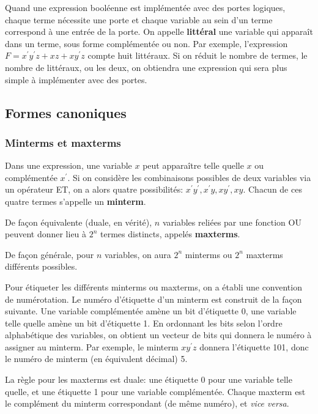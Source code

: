 \documentclass[11pt]{article}
\begin{document}
Quand une expression booléenne est implémentée avec des portes
logiques, chaque terme nécessite une porte et chaque variable au sein
d'un terme correspond à une entrée de la porte. On appelle \textbf{littéral}
une variable qui apparaît dans un terme, sous forme complémentée ou
non. Par exemple, l'expression \(F = x^\prime y^\prime z + xz +
xy^\prime z\) compte huit littéraux. Si on réduit le nombre de
termes, le nombre de littéraux, ou les deux, on obtiendra une
expression qui sera plus simple à implémenter avec des portes.

\subsection{Formes canoniques}
\label{sec:org1b14c21}

\subsubsection{Minterms et maxterms}
\label{sec:orgb44ef79}

Dans une expression, une variable \(x\) peut apparaître telle quelle
\(x\) ou complémentée \(x^\prime\). Si on considère les combinaisons
possibles de deux variables via un opérateur ET, on a alors quatre
possibilités: \(x^\prime y^\prime, x^\prime y, x y^\prime,x
y\). Chacun de ces quatre termes s'appelle un \textbf{minterm}.

De façon équivalente (duale, en vérité), \(n\) variables reliées par
une fonction OU peuvent donner lieu à \(2^n\) termes distincts,
appelés \textbf{maxterms}. 

De façon générale, pour \(n\) variables, on aura \(2^n\) minterms ou
\(2^n\) maxterms différents possibles.

Pour étiqueter les différents minterms ou maxterms, on a établi une
convention de numérotation. Le numéro d'étiquette d'un minterm est
construit de la façon suivante. Une variable complémentée amène un bit
d'étiquette 0, une variable telle quelle amène un bit d'étiquette 1.
En ordonnant les bits selon l'ordre alphabétique des variables, on
obtient un vecteur de bits qui donnera le numéro à assigner au
minterm.  Par exemple, le minterm \(x y^\prime z\) donnera l'étiquette
101, donc le numéro de minterm (en équivalent décimal) 5.

La règle pour les maxterms est duale: une étiquette 0 pour une
variable telle quelle, et une étiquette 1 pour une variable
complémentée. Chaque maxterm est le complément du minterm
correspondant (de même numéro), et \emph{vice versa}.
\end{document}

